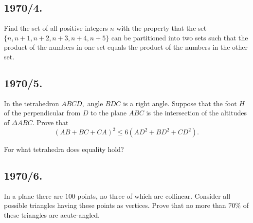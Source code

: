\documentclass[12pt,thmsa]{article}
\begin{document}
\subsection{1970/4.}

Find the set of all positive integers $n$ with the property that the set $%
\{n,n+1,n+2,n+3,n+4,n+5\}$ can be partitioned into two sets such that the
product of the numbers in one set equals the product of the numbers in the
other set.

\subsection{1970/5.}

In the tetrahedron $ABCD,$ angle $BDC$ is a right angle. Suppose that the
foot $H$ of the perpendicular from $D$ to the plane $ABC$ is the
intersection of the altitudes of $\Delta ABC.$ Prove that
\[
(AB+BC+CA)^{2}\leq 6(AD^{2}+BD^{2}+CD^{2}).
\]

For what tetrahedra does equality hold?

\subsection{1970/6.}

In a plane there are $100$ points, no three of which are collinear. Consider
all possible triangles having these points as vertices. Prove that no more
than $70\%$ of these triangles are acute-angled.
\end{document}
